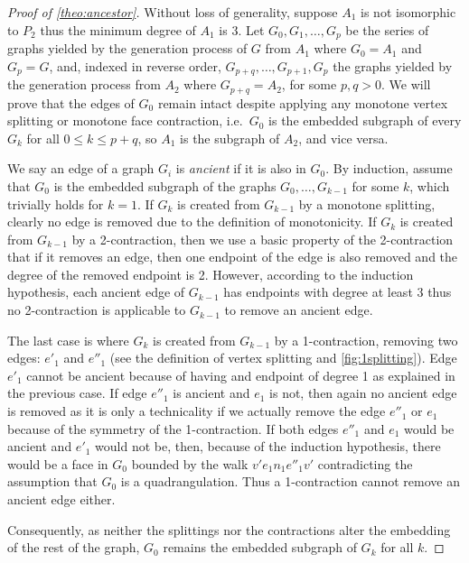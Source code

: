\documentclass[]{article}
\begin{document}
\begin{proof}[Proof of \autoref*{theo:ancestor}]
Without loss of generality, suppose $A_1$ is not isomorphic to $P_2$ thus the minimum degree of $A_1$ is 3.
Let $G_0,G_1,\ldots,G_p$ be the series of graphs yielded by the generation process of $G$ from $A_1$ where $G_0= A_1$ and $G_p= G$, and, indexed in reverse order, $G_{p+q},\ldots,G_{p+1},G_p$ the graphs yielded by the generation process from $A_2$ where $G_{p+q}= A_2$, for some $p,q>0$.
We will prove that the edges of $G_0$ remain intact despite applying any monotone vertex splitting or monotone face contraction,
i.e.~$G_0$ is the embedded subgraph of every $G_k$ for all $0\leq k \leq p+q$, so $A_1$ is the subgraph of $A_2$, and vice versa.

We say an edge of a graph $G_i$ is \emph{ancient} if it is also in $G_0$.
By induction, assume that $G_0$ is the embedded subgraph of the graphs $G_0,\ldots,G_{k-1}$ for some $k$, which trivially holds for $k=1$.
If $G_k$ is created from $G_{k-1}$ by a monotone splitting, 
clearly no edge is removed due to the definition of monotonicity.
If $G_k$ is created from $G_{k-1}$ by a 2-contraction, then we use a basic property of the 2-contraction that if it removes an edge, then one endpoint of the edge is also removed and the degree of the removed endpoint is 2.
However, according to the induction hypothesis, each ancient edge of $G_{k-1}$ has endpoints with degree at least 3 thus no 2-contraction is applicable to $G_{k-1}$ to remove an ancient edge.

The last case is where $G_k$ is created from $G_{k-1}$ by a 1-contraction, removing two edges: $e'_1$ and $e''_1$ (see the definition of vertex splitting and \autoref{fig:1splitting}).
Edge $e'_1$ cannot be ancient because of having and endpoint of degree 1 as explained in the previous case.
If edge $e''_1$ is ancient and $e_1$ is not, then again no ancient edge is removed as it is only a technicality if we actually remove the edge $e''_1$ or $e_1$ because of the symmetry of the 1-contraction.
If both edges $e''_1$ and $e_1$ would be ancient and $e'_1$ would not be, then, because of the induction hypothesis, there would be a face in $G_0$ bounded by the walk $v'e_1n_1e''_1v'$ contradicting the assumption that $G_0$ is a quadrangulation.
Thus a 1-contraction cannot remove an ancient edge either.

Consequently, as neither the splittings nor the contractions alter the embedding of the rest of the graph, $G_0$ remains the embedded subgraph of $G_k$ for all $k$.
\end{proof}
\end{document}

